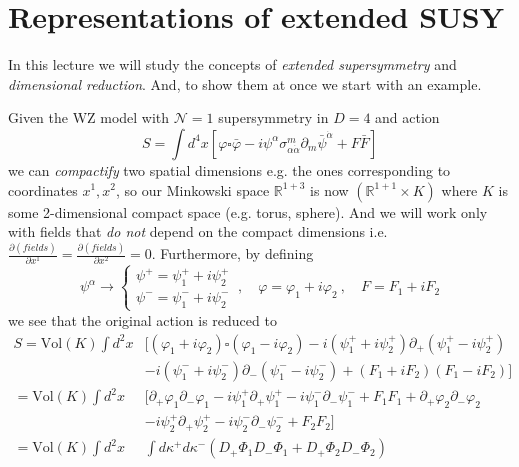 \documentclass[a4paper,12pt]{article}
\numberwithin{equation}{section}
\numberwithin{exe}{section}
\newcommand{\p}{{\partial}}
\newcommand{\Fb}{{\bar F}}
\renewcommand{\a}{{\alpha}}
\newcommand{\ad}{{\dot\alpha}}
\renewcommand{\k}{{\kappa}}
\newcommand{\s}{{\sigma}}
\newcommand{\vphi}{{\varphi}}
\newcommand{\vphib}{{\bar\varphi}}
\newcommand{\psib}{{\bar\psi}}
\begin{document}
\newpage

\section{Representations of extended SUSY}

In this lecture we will study the concepts of {\it extended supersymmetry} and {\it dimensional reduction}. And, to show them at once we start with an example.

Given the WZ model with $\mathcal N=1$ supersymmetry in $D=4$ and action
		\begin{equation}
		S = \int d^4x \left[ \vphi\square\vphib -i\psi^\a\s^m_{\a\ad} \p_m\psib^\ad + F\Fb \right]
		\end{equation}
we can {\it compactify} two spatial dimensions e.g. the ones corresponding to coordinates $x^1, x^2$, so our Minkowski space ${\mathbb R}^{1+3}$ is now $({\mathbb R}^{1+1}\times K)$ where $K$ is some 2-dimensional compact space (e.g. torus, sphere). And we will work only with fields that {\it do not} depend on the compact dimensions i.e. $\frac{\p(fields)}{\p x^1} = \frac{\p(fields)}{\p x^2} = 0$. Furthermore, by defining
	\begin{equation}
	\psi^\a\rightarrow \left\{
		\begin{array}{l}
		\psi^+ = \psi^+_1 + i\psi^+_2 \\
		\psi^- = \psi^-_1 + i\psi^-_2
		\end{array}
	\right.\ ,\quad \vphi = \vphi_1 + i\vphi_2\ ,\quad F= F_1 + iF_2
	\end{equation}
we see that the original action is reduced to
	\begin{align}
	S = \text{Vol}(K) \int d^2x & [(\vphi_1 + i\vphi_2)\square (\vphi_1 - i\vphi_2) - i(\psi^+_1 + i\psi^+_2)\p_+ (\psi^+_1 - i\psi^+_2) \nonumber \\
	&  -i(\psi^-_1 + i\psi^-_2)\p_-(\psi^-_1 - i\psi^-_2) + (F_1 +iF_2)(F_1 -iF_2) ] \nonumber \\
	= \text{Vol}(K) \int d^2x &[\p_+ \vphi_1 \p_- \vphi_1 - i\psi^+_1\p_+ \psi^+_1 -i\psi^-_1\p_-\psi^-_1 + F_1 F_1 + \p_+\vphi_2\p_-\vphi_2 \nonumber \\
	& -i\psi^+_2 \p_+\psi^+_2 -i\psi^-_2 \p_-\psi^-_2 + F_2 F_2] \nonumber \\
	= \text{Vol}(K) \int d^2x & \int d\k^+ d\k^- ( D_+\Phi_1 D_-\Phi_1 + D_+\Phi_2 D_-\Phi_2)
	\end{align}
\end{document}
